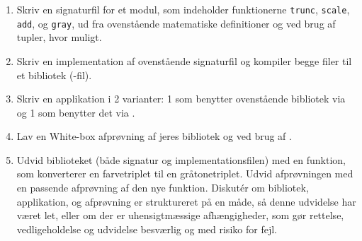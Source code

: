 \documentclass[a4paper,12pt]{article}
\begin{document}
\begin{enumerate}[label=4ø.\arabic*,start=0]
\item Skriv en signaturfil for et modul, som indeholder funktionerne \lstinline{trunc}, \lstinline{scale}, \lstinline{add}, og \lstinline{gray}, ud fra ovenstående matematiske definitioner og ved brug af tupler, hvor muligt.
\item Skriv en implementation af ovenstående signaturfil og kompiler begge filer til et bibliotek (-fil).
\item Skriv en applikation i 2 varianter: 1 som benytter ovenstående bibliotek via  og 1 som benytter det via .
\item Lav en White-box afprøvning af jeres bibliotek og ved brug af .
\item Udvid biblioteket (både signatur og implementationsfilen) med en funktion, som konverterer en farvetriplet til en gråtonetriplet. Udvid afprøvningen med en passende afprøvning af den nye funktion. Diskut\'{e}r om bibliotek, applikation, og afprøvning er struktureret på en måde, så denne udvidelse har været let, eller om der er uhensigtmæssige afhængigheder, som gør rettelse, vedligeholdelse og udvidelse besværlig og med risiko for fejl.
\end{enumerate}
\end{document}
